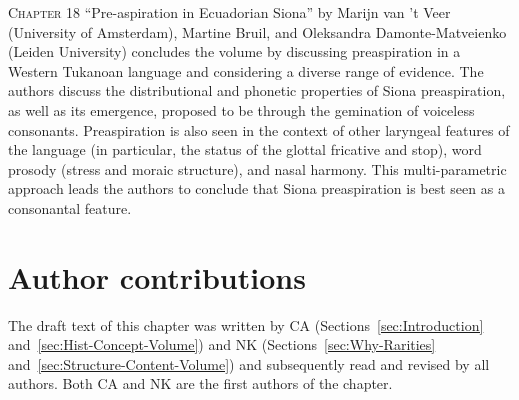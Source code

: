 \documentclass[output=paper]{langscibook}
\begin{document}
\textsc{Chapter 18} “Pre-aspiration in Ecuadorian Siona” by Marijn van ’t Veer (University of Amsterdam), Martine Bruil, and Oleksandra Damonte-Matveienko (Leiden University) concludes the volume by discussing preaspiration in a Western Tukanoan language and considering a diverse range of evidence. The authors discuss the distributional and phonetic properties of Siona preaspiration, as well as its emergence, proposed to be through the gemination of voiceless consonants. Preaspiration is also seen in the context of other laryngeal features of the language (in particular, the status of the glottal fricative and stop), word prosody (stress and moraic structure), and nasal harmony. This multi-parametric approach leads the authors to conclude that Siona preaspiration is best seen as a consonantal feature.

\section*{Author contributions}

The draft text of this chapter was written by CA (Sections~\ref{sec:Introduction} and~\ref{sec:Hist-Concept-Volume}) and NK (Sections~\ref{sec:Why-Rarities} and~\ref{sec:Structure-Content-Volume}) and subsequently read and revised by all authors. Both CA and NK are the first authors of the chapter.

\printbibliography[heading=subbibliography,notkeyword=this]
\end{document}
